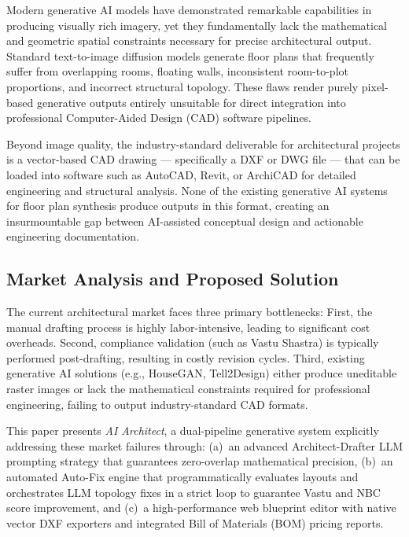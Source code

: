 \documentclass[10pt, twocolumn, letterpaper]{article}
\begin{document}
Modern generative AI models have demonstrated remarkable capabilities in
producing visually rich imagery, yet they fundamentally lack the mathematical
and geometric spatial constraints necessary for precise architectural output.
Standard text-to-image diffusion models generate floor plans that frequently
suffer from overlapping rooms, floating walls, inconsistent room-to-plot
proportions, and incorrect structural topology. These flaws render purely
pixel-based generative outputs entirely unsuitable for direct integration into
professional Computer-Aided Design (CAD) software pipelines.

Beyond image quality, the industry-standard deliverable for architectural
projects is a vector-based CAD drawing --- specifically a DXF or DWG file ---
that can be loaded into software such as AutoCAD, Revit, or ArchiCAD for
detailed engineering and structural analysis. None of the existing generative
AI systems for floor plan synthesis produce outputs in this format, creating
an insurmountable gap between AI-assisted conceptual design and actionable
engineering documentation.

\subsection{Market Analysis and Proposed Solution}
The current architectural market faces three primary bottlenecks: First, the manual drafting process is highly labor-intensive, leading to significant cost overheads. Second, compliance validation (such as Vastu Shastra) is typically performed post-drafting, resulting in costly revision cycles. Third, existing generative AI solutions (e.g., HouseGAN, Tell2Design) either produce uneditable raster images or lack the mathematical constraints required for professional engineering, failing to output industry-standard CAD formats.

This paper presents \textit{AI Architect}, a dual-pipeline generative system explicitly addressing these market failures through: (a)~an advanced Architect-Drafter LLM prompting strategy that guarantees zero-overlap mathematical precision, (b)~an automated Auto-Fix engine that programmatically evaluates layouts and orchestrates LLM topology fixes in a strict loop to guarantee Vastu and NBC score improvement, and (c)~a high-performance web blueprint editor with native vector DXF exporters and integrated Bill of Materials (BOM) pricing reports.
\end{document}
